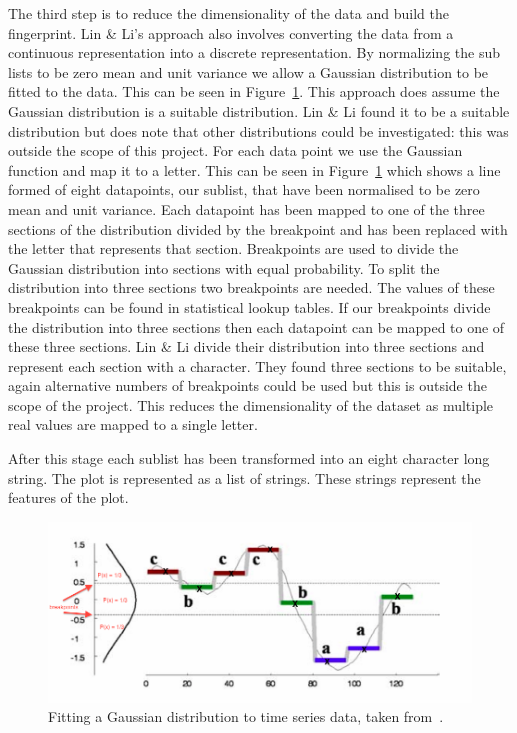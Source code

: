 The third step is to reduce the dimensionality of the data and build the fingerprint.  Lin \& Li's approach also involves converting the data from a continuous representation into a discrete representation.  By normalizing the sub lists to be zero mean and unit variance we allow a Gaussian distribution to be fitted to the data.  This can be seen in Figure~\ref{fig:gaussian_plot}.  This approach does assume the Gaussian distribution is a suitable distribution.  Lin \& Li found it to be a suitable distribution but does note that other distributions could be investigated: this was outside the scope of this project.  For each data point we use the Gaussian function and map it to a letter.  This can be seen in Figure~\ref{fig:gaussian_plot} which shows a line formed of eight datapoints, our sublist, that have been normalised to be zero mean and unit variance.  Each datapoint has been mapped to one of the three sections of the distribution divided by the breakpoint and has been replaced with the letter that represents that section.  Breakpoints are used to divide the Gaussian distribution into sections with equal probability.  To split the distribution into three sections two breakpoints are needed. The values of these breakpoints can be found in statistical lookup tables.  If our breakpoints divide the distribution into three sections then each datapoint can be mapped to one of these three sections.  Lin \& Li divide their distribution into three sections and represent each section with a character.  They found three sections to be suitable, again alternative numbers of breakpoints could be used but this is outside the scope of the project.  This reduces the dimensionality of the dataset as multiple real values are mapped to a single letter.

After this stage each sublist has been transformed into an eight character long string.  The plot is represented as a list of strings.  These strings represent the features of the plot.

\begin{figure}[h!]
    \centering
    \includegraphics[width=\textwidth]{images/similiarty_normalise.png}
    \caption{Fitting a Gaussian distribution to time series data, taken from~\cite{structural_similarity}.}
    \label{fig:gaussian_plot}
\end{figure}

